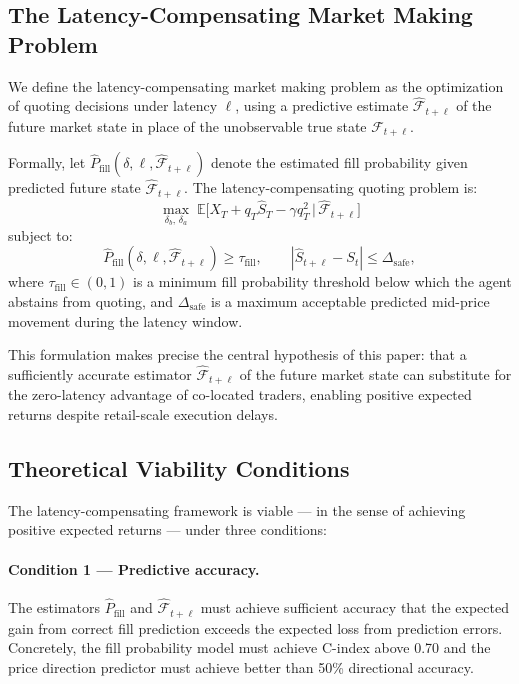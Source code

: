 \documentclass[12pt]{article}
\newcommand{\pfill}{\hat{P}_{\mathrm{fill}}}
\newcommand{\given}{\,|\,}
\begin{document}
\subsection{The Latency-Compensating Market Making Problem}

We define the latency-compensating market making problem as the optimization of quoting decisions under latency $\ell$, using a predictive estimate $\hat{\mathcal{F}}_{t+\ell}$ of the future market state in place of the unobservable true state $\mathcal{F}_{t+\ell}$.

Formally, let $\pfill(\delta, \ell, \hat{\mathcal{F}}_{t+\ell})$ denote the estimated fill probability given predicted future state $\hat{\mathcal{F}}_{t+\ell}$. The latency-compensating quoting problem is:
\begin{equation}
  \max_{\delta_b,\, \delta_a} \;\mathbb{E}\bigl[X_T + q_T \hat{S}_T - \gamma q_T^2 \given \hat{\mathcal{F}}_{t+\ell}\bigr]
\end{equation}
subject to:
\begin{equation}
  \pfill(\delta, \ell, \hat{\mathcal{F}}_{t+\ell}) \geq \tau_{\mathrm{fill}}, \qquad
  |\hat{S}_{t+\ell} - S_t| \leq \Delta_{\mathrm{safe}},
\end{equation}
where $\tau_{\mathrm{fill}} \in (0,1)$ is a minimum fill probability threshold below which the agent abstains from quoting, and $\Delta_{\mathrm{safe}}$ is a maximum acceptable predicted mid-price movement during the latency window.

This formulation makes precise the central hypothesis of this paper: that a sufficiently accurate estimator $\hat{\mathcal{F}}_{t+\ell}$ of the future market state can substitute for the zero-latency advantage of co-located traders, enabling positive expected returns despite retail-scale execution delays.

\subsection{Theoretical Viability Conditions}

The latency-compensating framework is viable --- in the sense of achieving positive expected returns --- under three conditions:

\paragraph{Condition 1 --- Predictive accuracy.} The estimators $\pfill$ and $\hat{\mathcal{F}}_{t+\ell}$ must achieve sufficient accuracy that the expected gain from correct fill prediction exceeds the expected loss from prediction errors. Concretely, the fill probability model must achieve C-index above 0.70 and the price direction predictor must achieve better than 50\% directional accuracy.
\end{document}
